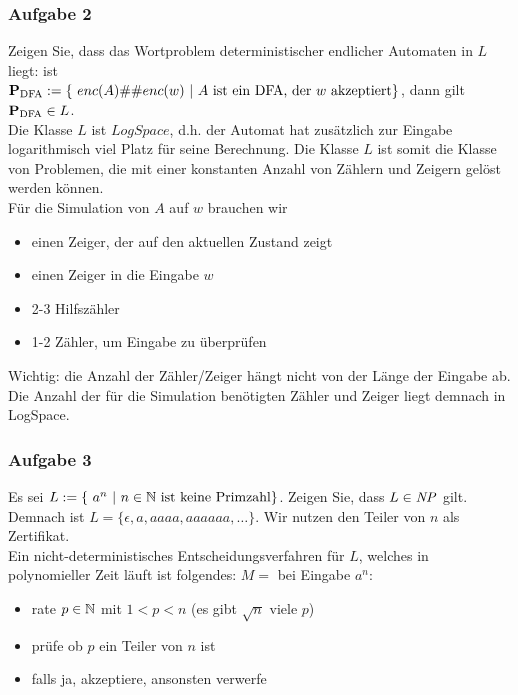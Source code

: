 \newpage
\subsubsection*{Aufgabe 2}
    Zeigen Sie, dass das Wortproblem deterministischer endlicher Automaten in $L$ liegt: ist \\
    $\prspec{DFA} := \{\ enc(A) \#\# enc(w)\ |\ A\ \text{ist ein DFA, der $w$ akzeptiert} \}$, dann gilt $\textbf{P}_{\text{DFA}} \in L$. \\

    \LOES Die Klasse $L$ ist $LogSpace$, d.h. der Automat hat zusätzlich zur Eingabe logarithmisch viel Platz für seine Berechnung. Die Klasse $L$ ist somit die Klasse von Problemen, die mit einer konstanten Anzahl von Zählern und Zeigern gelöst werden können. \\

    Für die Simulation von $A$ auf $w$ brauchen wir
    \begin{itemize}
        \item einen Zeiger, der auf den aktuellen Zustand zeigt
        \item einen Zeiger in die Eingabe $w$
        \item 2-3 Hilfszähler
        \item 1-2 Zähler, um Eingabe zu überprüfen
    \end{itemize}
    Wichtig: die Anzahl der Zähler/Zeiger hängt nicht von der Länge der Eingabe ab.
    Die Anzahl der für die Simulation benötigten Zähler und Zeiger liegt demnach in LogSpace.


\subsubsection*{Aufgabe 3}
    Es sei $L := \{\ a^{n}\ |\ \text{$n \in \mathbb{N}$ ist keine Primzahl} \}$. Zeigen Sie, dass $L \in \mathit{NP}$ gilt. \\

    \LOES Demnach ist $L = \{ \epsilon, a, aaaa, aaaaaa, \dots \}$. Wir nutzen den Teiler von $n$ als Zertifikat. \\
    Ein nicht-deterministisches Entscheidungsverfahren für $L$, welches in polynomieller Zeit läuft ist folgendes: $M =$ bei Eingabe $a^{n}$:
    \begin{itemize}
        \item rate $p \in \mathbb{N}$ mit $1 < p < n$ (es gibt $\sqrt{n}$ viele $p$)
        \item prüfe ob $p$ ein Teiler von $n$ ist
        \item falls ja, akzeptiere, ansonsten verwerfe
    \end{itemize}

